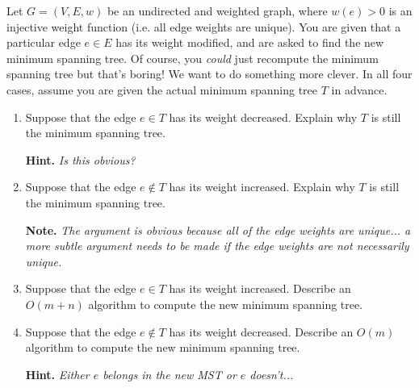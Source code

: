 \documentclass{article}
\begin{document}
\begin{question}
Let $G = (V, E, w)$ be an undirected and weighted graph, where $w(e) > 0$ is an injective weight function (i.e. all edge weights are unique). You are given that a particular edge $e \in E$ has its weight modified, and are asked to find the new minimum spanning tree. Of course, you {\em could} just recompute the minimum spanning tree but that's boring! We want to do something more clever. In all four cases, assume you are given the actual minimum spanning tree $T$ in advance.

\begin{enumerate}[label = (\alph*)]
    \item Suppose that the edge $e \in T$ has its weight decreased. Explain why $T$ is still the minimum spanning tree.

    {\bfseries Hint.} {\em Is this obvious?}

    \item Suppose that the edge $e \not\in T$ has its weight increased. Explain why $T$ is still the minimum spanning tree.

    {\bfseries Note.} {\em The argument is obvious because all of the edge weights are unique... a more subtle argument needs to be made if the edge weights are not necessarily unique.}

    \item Suppose that the edge $e \in T$ has its weight increased. Describe an $O(m + n)$ algorithm to compute the new minimum spanning tree.

    \item Suppose that the edge $e \not\in T$ has its weight decreased. Describe an $O(m)$ algorithm to compute the new minimum spanning tree.

    {\bfseries Hint.} {\em Either $e$ belongs in the new MST or $e$ doesn't...}
\end{enumerate}
\end{question}
\end{document}
